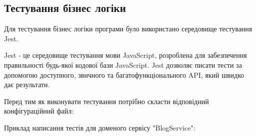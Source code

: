 \subsection{Тестування бізнес логіки}

Для тестування бізнес логіки програми було використано середовище тестування Jest.

Jest - це середовище тестування мови JavaScript,
розроблена для забезпечення правильності будь-якої кодової бази JavaScript.
Jest дозволяє писати тести за допомогою доступного,
звичного та багатофункціонального API, який швидко дає результати.

Перед тим як виконувати тестування потрібно скласти відповідний 
конфігураційний файл:


Приклад написання тестів для доменого сервісу "BlogService":


